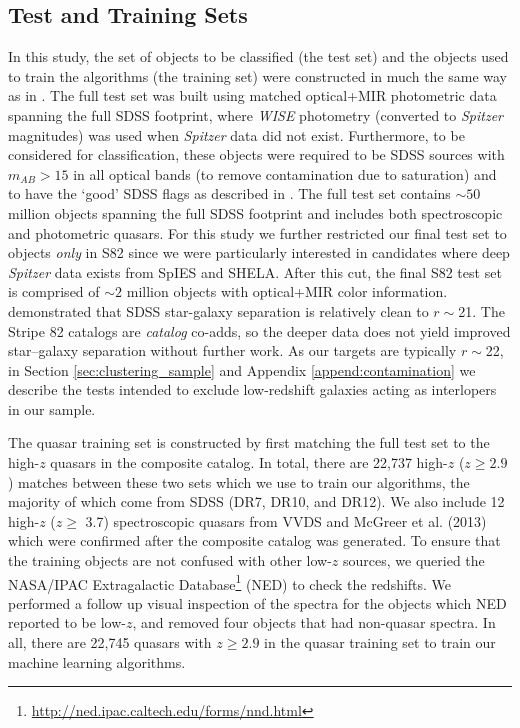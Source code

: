 \documentclass[apj, numberedappendix]{emulateapj}
\begin{document}
\subsection{Test and Training Sets}\label{sec:ttsets}

In this study, the set of objects to be classified (the test set) and the objects used to train the algorithms (the training set) were constructed in much the same way as in \citet{Richards2015}. The full test set was built using matched optical+MIR photometric data spanning the full SDSS footprint, where \emph{WISE} photometry (converted to \emph{Spitzer} magnitudes) was used when \emph{Spitzer} data did not exist. Furthermore, to be considered for classification, these objects were required to be SDSS sources with $m_{AB}>15$ in all optical bands (to remove contamination due to saturation) and to have the `good' SDSS flags as described in \citet{Richards2015}. The full test set contains $\sim 50$ million objects spanning the full SDSS footprint and includes both spectroscopic and photometric quasars. For this study we further restricted our final test set to objects \emph{only} in S82 since we were particularly interested in candidates where deep \emph{Spitzer} data exists from SpIES and SHELA. After this cut, the final S82 test set is comprised of $\sim2$ million objects with optical+MIR color information. \citet{Scranton2002} demonstrated that SDSS star-galaxy separation is relatively clean to $r\sim$21. The Stripe 82 catalogs are \emph{catalog} co-adds, so the deeper data does not yield improved star--galaxy separation without further work. As our targets are typically $r\sim$22, in Section \ref{sec:clustering_sample} and Appendix \ref{append:contamination} we describe the tests intended to exclude low-redshift galaxies acting as interlopers in our sample.

The quasar training set is constructed by first matching the full test set to the high-$z$ quasars in the \citet{Richards2015} composite catalog. In total, there are 22,737 high-$z$ ($z \ge 2.9$) matches between these two sets which we use to train our algorithms, the majority of which come from SDSS (DR7, DR10, and DR12). We also include 12 high-$z$ ($z \geq$ 3.7) spectroscopic quasars from VVDS and McGreer et al. (2013) which were confirmed after the composite catalog was generated. To ensure that the training objects are not confused with other low-$z$ sources, we queried the NASA/IPAC Extragalactic Database\footnote{\url{http://ned.ipac.caltech.edu/forms/nnd.html}} (NED) to check the redshifts. We performed a follow up visual inspection of the spectra for the objects which NED reported to be low-$z$, and removed four objects that had non-quasar spectra. In all, there are 22,745 quasars with $z \geq 2.9$ in the quasar training set to train our machine learning algorithms.
\end{document}
